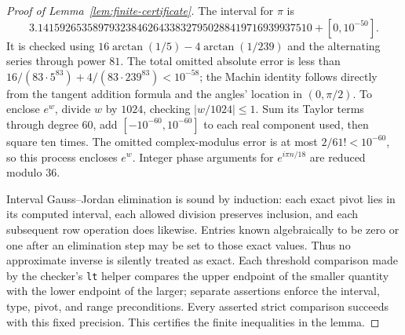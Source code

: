 \documentclass[11pt]{article}
\theoremstyle{remark}\newtheorem{remark}[theorem]{Remark}
\begin{document}
\begin{proof}[Proof of Lemma~\ref{lem:finite-certificate}]
The interval for $\pi$ is
\[
 3.14159265358979323846264338327950288419716939937510
       +[0,10^{-50}].
\]
It is checked using $16\arctan(1/5)-4\arctan(1/239)$ and the
alternating series through power $81$. The total omitted absolute error
is less than
$16/(83\cdot5^{83})+4/(83\cdot239^{83})<10^{-58}$;
the Machin identity follows directly from the tangent addition formula
and the angles' location in $(0,\pi/2)$.
To enclose $e^w$, divide $w$ by $1024$, checking $|w/1024|\leq1$.
Sum its Taylor terms through degree $60$, add $[-10^{-60},10^{-60}]$
to each real component used, then square ten times.
The omitted complex-modulus error is at most
$2/61!<10^{-60}$, so this process encloses $e^w$.
Integer phase arguments for $e^{i\pi n/18}$ are reduced modulo $36$.

Interval Gauss--Jordan elimination is sound by induction: each exact
pivot lies in its computed interval, each allowed division preserves
inclusion, and each subsequent row operation does likewise. Entries
known algebraically to be zero or one after an elimination step may be
set to those exact values. Thus no approximate inverse is silently
treated as exact. Each threshold comparison made by the checker's
\texttt{lt} helper compares the upper endpoint of the smaller quantity
with the lower endpoint of the larger; separate assertions enforce the
interval, type, pivot, and range preconditions.
Every asserted strict comparison succeeds with this fixed precision.
This certifies the finite inequalities in the lemma.
\end{proof}
\end{document}
